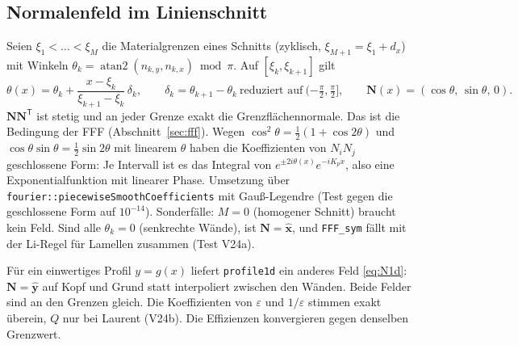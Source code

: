 \subsection{Normalenfeld im Linienschnitt}\label{sec:cad1d_nf}
Seien $\xi_1<\dots<\xi_M$ die Materialgrenzen eines Schnitts (zyklisch, $\xi_{M+1}=\xi_1+d_x$) mit Winkeln
$\theta_k=\operatorname{atan2}(n_{k,y},n_{k,x})\bmod\pi$. Auf $[\xi_k,\xi_{k+1}]$ gilt
\begin{equation}
  \theta(x)=\theta_k+\frac{x-\xi_k}{\xi_{k+1}-\xi_k}\,\delta_k,\qquad
  \delta_k=\theta_{k+1}-\theta_k\ \text{reduziert auf}\ (-\tfrac\pi2,\tfrac\pi2],\qquad
  \mathbf N(x)=(\cos\theta,\,\sin\theta,\,0).\label{eq:cad1d_N}
\end{equation}
$\mathbf N\mathbf N^{\mathsf T}$ ist stetig und an jeder Grenze exakt die Grenzflächennormale. Das ist die Bedingung der
FFF (Abschnitt~\ref{sec:fff}). Wegen $\cos^2\theta=\tfrac12(1+\cos2\theta)$ und $\cos\theta\sin\theta=\tfrac12\sin2\theta$
mit linearem $\theta$ haben die Koeffizienten von $N_iN_j$ geschlossene Form: Je Intervall ist es das Integral von
$e^{\pm2i\theta(x)}e^{-iK_px}$, also eine Exponentialfunktion mit linearer Phase. Umsetzung über
\verb|fourier::piecewiseSmoothCoefficients| mit Gauß-Legendre (Test gegen die geschlossene Form auf $10^{-14}$).
Sonderfälle: $M=0$ (homogener Schnitt) braucht kein Feld. Sind alle $\theta_k=0$ (senkrechte Wände), ist
$\mathbf N=\hat{\mathbf x}$, und \verb|FFF_sym| fällt mit der Li-Regel für Lamellen zusammen (Test V24a).

Für ein einwertiges Profil $y=g(x)$ liefert \verb|profile1d| ein anderes Feld \eqref{eq:N1d}: $\mathbf N=\hat{\mathbf y}$
auf Kopf und Grund statt interpoliert zwischen den Wänden. Beide Felder sind an den Grenzen gleich. Die Koeffizienten
von $\varepsilon$ und $1/\varepsilon$ stimmen exakt überein, $Q$ nur bei Laurent (V24b). Die Effizienzen
konvergieren gegen denselben Grenzwert.

